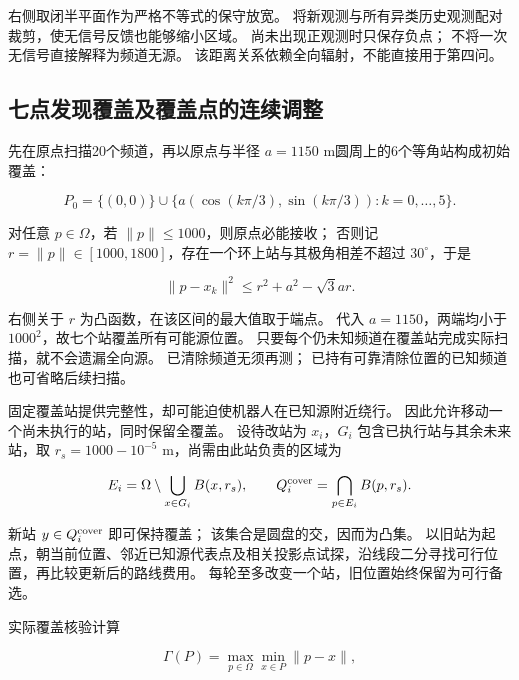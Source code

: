 右侧取闭半平面作为严格不等式的保守放宽。
将新观测与所有异类历史观测配对裁剪，使无信号反馈也能够缩小区域。
尚未出现正观测时只保存负点；
不将一次无信号直接解释为频道无源。
该距离关系依赖全向辐射，不能直接用于第四问。

\subsection{七点发现覆盖及覆盖点的连续调整}\label{sec:q3-2}

先在原点扫描20个频道，再以原点与半径 \(a=1150\) m圆周上的6个等角站构成初始覆盖：

\begin{equation}\label{eq:q3-4}
P_0=\{(0,0)\}\cup
\{a(\cos(k\pi/3),\sin(k\pi/3)):k=0,\ldots,5\}.
\end{equation}

对任意 \(p\in\Omega\)，若 \(\|p\|\le1000\)，则原点必能接收；
否则记 \(r=\|p\|\in[1000,1800]\)，存在一个环上站与其极角相差不超过 \(30^\circ\)，于是

\begin{equation}\label{eq:q3-5}
\|p-x_k\|^2\le r^2+a^2-\sqrt3ar.
\end{equation}

右侧关于 \(r\) 为凸函数，在该区间的最大值取于端点。
代入 \(a=1150\)，两端均小于 \(1000^2\)，故七个站覆盖所有可能源位置。
只要每个仍未知频道在覆盖站完成实际扫描，就不会遗漏全向源。
已清除频道无须再测；
已持有可靠清除位置的已知频道也可省略后续扫描。

固定覆盖站提供完整性，却可能迫使机器人在已知源附近绕行。
因此允许移动一个尚未执行的站，同时保留全覆盖。
设待改站为 \(x_i\)，\(G_i\) 包含已执行站与其余未来站，取 \(r_s=1000-10^{-5}\) m，尚需由此站负责的区域为

\begin{equation}\label{eq:q3-6}
E_i=\Omega\setminus\bigcup_{x\in G_i}B(x,r_s),
\qquad Q_i^{\rm cover}=\bigcap_{p\in E_i}B(p,r_s).
\end{equation}

新站 \(y\in Q_i^{\rm cover}\) 即可保持覆盖；
该集合是圆盘的交，因而为凸集。
以旧站为起点，朝当前位置、邻近已知源代表点及相关投影点试探，沿线段二分寻找可行位置，再比较更新后的路线费用。
每轮至多改变一个站，旧位置始终保留为可行备选。

实际覆盖核验计算

\begin{equation}\label{eq:q3-7}
\Gamma(P)=\max_{p\in\Omega}\min_{x\in P}\|p-x\|,
\end{equation}

